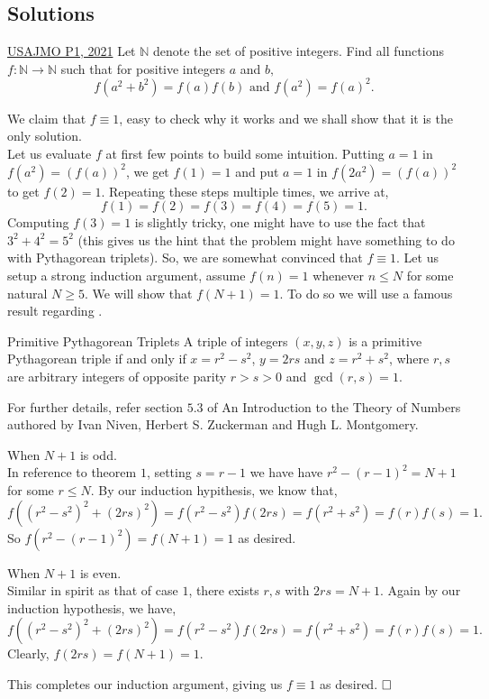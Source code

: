 \subsection{Solutions}
\begin{problem}{1}{\href{https://artofproblemsolving.com/community/q2h2529938p34791441}{USAJMO P1, 2021}}
	Let $\mathbb{N}$ denote the set of positive integers. Find all functions $f : \mathbb{N} \rightarrow \mathbb{N}$ such that for positive integers $a$ and $b,$\[f(a^2 + b^2) = f(a)f(b) \text{ and } f(a^2) = f(a)^2.\]
	\begin{solution} We claim that $f\equiv 1$, easy to check why it works and we shall show that it is the only solution.\\
Let us evaluate $f$ at first few points to build some intuition. Putting $a=1$ in $f(a^2)=(f(a))^2$, we get $f(1)=1$ and put $a=1$ in $f(2a^2)=(f(a))^2$ to get $f(2)=1$. Repeating these steps multiple times, we arrive at,
$$f(1)=f(2)=f(3)=f(4)=f(5)=1.$$Computing $f(3)=1$ is slightly tricky, one might have to use the fact that $3^2+4^2=5^2$ (this gives us the hint that the problem might have something to do with Pythagorean triplets). So, we are somewhat convinced that $f\equiv 1$.
Let us setup a strong induction argument, assume $f(n)=1$ whenever $n\le N$ for some natural $N\ge 5$. We will show that $f(N+1)=1$. To do so we will use a famous result regarding .
		\begin{theorem}{1}{Primitive Pythagorean Triplets} A triple of integers $(x,y,z)$ is a primitive Pythagorean triple if and only if $x=r^2-s^2$, $y=2rs$ and $z=r^2+s^2$, where $r,s$ are arbitrary integers of opposite parity $r>s>0$ and $\gcd(r,s)=1$.
	\end{theorem}
	For further details, refer section $5.3$ of An Introduction to the Theory of Numbers authored by Ivan Niven, Herbert S. Zuckerman and Hugh L. Montgomery.\\

	\begin{mycases}
		\item When $N+1$ is odd.\\
		In reference to theorem $1$, setting $s=r-1$ we have have $r^2-(r-1)^2=N+1$ for some $r\le N$. By our induction hypithesis, we know that,
		$$f((r^2-s^2)^2+(2rs)^2)=f(r^2-s^2)f(2rs)=f(r^2+s^2)=f(r)f(s)=1.$$So $f(r^2-(r-1)^2)=f(N+1)=1$ as desired.

		\item When $N+1$ is even.\\
		Similar in spirit as that of case $1$, there exists $r,s$ with $2rs=N+1$. Again by our induction hypothesis, we have,
		$$f((r^2-s^2)^2+(2rs)^2)=f(r^2-s^2)f(2rs)=f(r^2+s^2)=f(r)f(s)=1.$$Clearly, $f(2rs)=f(N+1)=1$.
	\end{mycases}

	\noindent This completes our induction argument, giving us $f\equiv 1$ as desired. $\qedwhite$
	\end{solution}
\end{problem}


